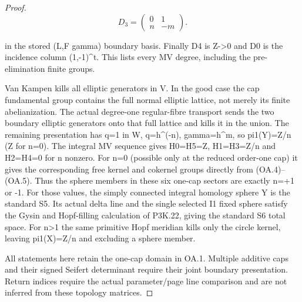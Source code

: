 \begin{proof}
\[
D_3=\begin{pmatrix}0&1\\n&-m\end{pmatrix}.\tag{OA.5}
\]

in the stored (L,F gamma) boundary basis. Finally D4 is
Z-\textgreater0 and D0 is the incidence column (1,-1)\^{}t. This lists
every MV degree, including the pre-elimination finite groups.

Van Kampen kills all elliptic generators in V. In the good case
the cap fundamental group contains the full normal elliptic
lattice, not merely its finite abelianization. The actual
degree-one regular-fibre transport sends the two boundary
elliptic generators onto that full lattice and kills it in
the union. The remaining presentation has q=1 in W,
q=h\^{}(-n), gamma=h\^{}m, so pi1(Y)=Z/\textbar n\textbar{} (Z for n=0).
The integral MV sequence gives H0=H5=Z,
H1=H3=Z/\textbar n\textbar{} and H2=H4=0 for n nonzero. For n=0 (possible
only at the reduced order-one cap) it gives the corresponding
free kernel and cokernel groups directly from (OA.4)--(OA.5).
Thus the sphere members in these six one-cap sectors are exactly
n=+1 or -1. For those values, the simply connected integral
homology sphere Y is the standard S5. Its actual delta line
and the single selected I1 fixed sphere satisfy the Gysin and
Hopf-filling calculation of P3K.22, giving the standard S6
total space. For \textbar n\textbar\textgreater1 the same primitive Hopf meridian kills
only the circle kernel, leaving pi1(X)=Z/\textbar n\textbar{} and excluding a
sphere member.

All statements here retain the one-cap domain in OA.1. Multiple
additive caps and their signed Seifert determinant require their
joint boundary presentation. Return indices require the actual
parameter/page line comparison and are not inferred from these
topology matrices.
\end{proof}
